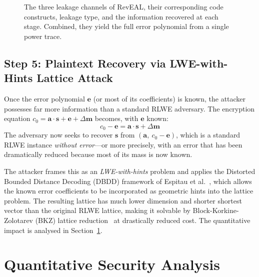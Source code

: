 \documentclass[sigconf,nonacm]{acmart}
\begin{document}
\begin{figure}[t]
\caption{The three leakage channels of RevEAL, their corresponding code constructs,
  leakage type, and the information recovered at each stage. Combined, they yield
  the full error polynomial from a single power trace.}
\label{fig:leakage_channels}
\end{figure}

\subsection{Step 5: Plaintext Recovery via LWE-with-Hints Lattice Attack}

Once the error polynomial $\mathbf{e}$ (or most of its coefficients) is known, the
attacker possesses far more information than a standard RLWE adversary. The
encryption equation
$c_0 = \mathbf{a}\cdot\mathbf{s} + \mathbf{e} + \Delta\mathbf{m}$
becomes, with $\mathbf{e}$ known:
\[
  c_0 - \mathbf{e} = \mathbf{a}\cdot\mathbf{s} + \Delta\mathbf{m}
\]
The adversary now seeks to recover $\mathbf{s}$ from $(\mathbf{a},\
c_0 - \mathbf{e})$, which is a standard RLWE instance \emph{without error}---or
more precisely, with an error that has been dramatically reduced because most of its
mass is now known.

The attacker frames this as an \emph{LWE-with-hints} problem and applies the
Distorted Bounded Distance Decoding (DBDD) framework of Espitau et al.~\cite{espitau2020},
which allows the known error coefficients to be incorporated as geometric hints
into the lattice problem. The resulting lattice has much lower dimension and shorter
shortest vector than the original RLWE lattice, making it solvable by
Block-Korkine-Zolotarev (BKZ) lattice reduction~\cite{bkz1994} at drastically
reduced cost. The quantitative impact is analysed in Section~\ref{sec:security}.

\section{Quantitative Security Analysis}
\label{sec:security}
\end{document}
